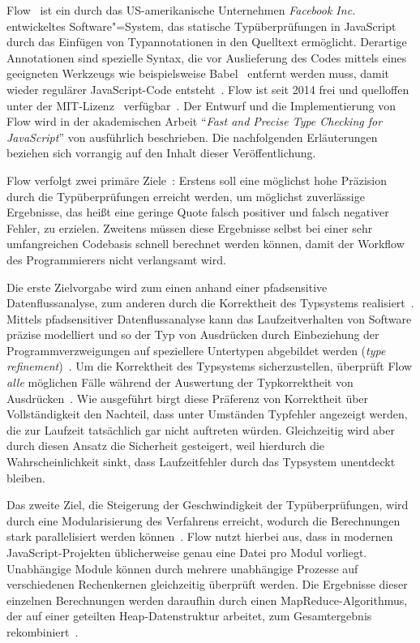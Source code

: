 Flow~\autocite{FLOW:PAPER} ist ein durch das US-amerikanische Unternehmen \textit{Facebook Inc.} entwickeltes Software"=System, das statische Typüberprüfungen in JavaScript durch das Einfügen von Typannotationen in den Quelltext ermöglicht. Derartige Annotationen sind spezielle Syntax, die vor Auslieferung des Codes mittels eines geeigneten Werkzeugs wie beispielsweise Babel~\autocite{BABEL} entfernt werden muss, damit wieder regulärer JavaScript-Code entsteht~\autocite{FLOW:INSTALLATION}. Flow ist seit 2014 frei und quelloffen unter der MIT-Lizenz~\autocite{LICENSE:MIT} verfügbar~\autocite{FLOW:GITHUB}. Der Entwurf und die Implementierung von Flow wird in der akademischen Arbeit \enquote{\textit{Fast and Precise Type Checking for JavaScript}} von \citeauthor{FLOW:PAPER} ausführlich beschrieben. Die nachfolgenden Erläuterungen beziehen sich vorrangig auf den Inhalt dieser Veröffentlichung.

Flow verfolgt zwei primäre Ziele~\autocite{FLOW:TYPE_SYSTEM}: Erstens soll eine möglichst hohe Präzision durch die Typüberprüfungen erreicht werden, um möglichst zuverlässige Ergebnisse, das heißt eine geringe Quote falsch positiver und falsch negativer Fehler, zu erzielen. Zweitens müssen diese Ergebnisse selbst bei einer sehr umfangreichen Codebasis schnell berechnet werden können, damit der Workflow des Programmierers nicht verlangsamt wird.

Die erste Zielvorgabe wird zum einen anhand einer pfadsensitive Datenflussanalyse, zum anderen durch die Korrektheit des Typsystems realisiert~\autocite{FLOW:TYPE_SYSTEM}. Mittels pfadsensitiver Datenflussanalyse kann das Laufzeitverhalten von Software präzise modelliert und so der Typ von Ausdrücken durch Einbeziehung der Programmverzweigungen auf speziellere Untertypen abgebildet werden (\textit{type refinement})~\cites{WINTER:2013}[2]{FLOW:PAPER}.
Um die Korrektheit des Typsystems sicherzustellen, überprüft Flow \emph{alle} möglichen Fälle während der Auswertung der Typkorrektheit von Ausdrücken~\autocite{FLOW:TYPES_AND_EXPRESSIONS}. Wie ausgeführt birgt diese Präferenz von Korrektheit über Vollständigkeit den Nachteil, dass unter Umständen Typfehler angezeigt werden, die zur Laufzeit tatsächlich gar nicht auftreten würden. Gleichzeitig wird aber durch diesen Ansatz die Sicherheit gesteigert, weil hierdurch die Wahrscheinlichkeit sinkt, dass Laufzeitfehler durch das Typsystem unentdeckt bleiben.

Das zweite Ziel, die Steigerung der Geschwindigkeit der Typüberprüfungen, wird durch eine Modularisierung des Verfahrens erreicht, wodurch die Berechnungen stark parallelisiert werden können~\autocite[4]{FLOW:PAPER}. Flow nutzt hierbei aus, dass in modernen JavaScript-Projekten üblicherweise genau eine Datei pro Modul vorliegt. Unabhängige Module können durch mehrere unabhängige Prozesse auf verschiedenen Rechenkernen gleichzeitig überprüft werden. Die Ergebnisse dieser einzelnen Berechnungen werden daraufhin durch einen MapReduce-Algorithmus, der auf einer geteilten Heap-Datenstruktur arbeitet, zum Gesamtergebnis rekombiniert~\autocite[22\psq]{FLOW:PAPER}.

